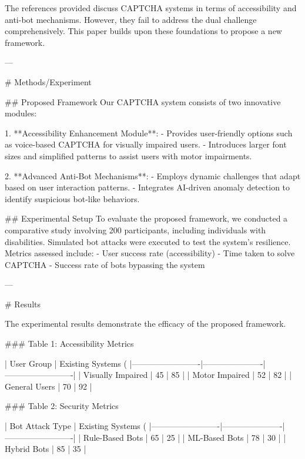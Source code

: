 The references provided discuss CAPTCHA systems in terms of accessibility and anti-bot mechanisms. However, they fail to address the dual challenge comprehensively. This paper builds upon these foundations to propose a new framework.

---

# Methods/Experiment  

## Proposed Framework  
Our CAPTCHA system consists of two innovative modules:  

1. **Accessibility Enhancement Module**:  
   - Provides user-friendly options such as voice-based CAPTCHA for visually impaired users.  
   - Introduces larger font sizes and simplified patterns to assist users with motor impairments.  

2. **Advanced Anti-Bot Mechanisms**:  
   - Employs dynamic challenges that adapt based on user interaction patterns.  
   - Integrates AI-driven anomaly detection to identify suspicious bot-like behaviors.  

## Experimental Setup  
To evaluate the proposed framework, we conducted a comparative study involving 200 participants, including individuals with disabilities. Simulated bot attacks were executed to test the system's resilience. Metrics assessed include:  
- User success rate (accessibility)  
- Time taken to solve CAPTCHA  
- Success rate of bots bypassing the system  

---

# Results  

The experimental results demonstrate the efficacy of the proposed framework.  

### Table 1: Accessibility Metrics  

| User Group              | Existing Systems (%
|-------------------------|----------------------|-------------------------|  
| Visually Impaired       | 45                  | 85                      |  
| Motor Impaired          | 52                  | 82                      |  
| General Users           | 70                  | 92                      |  

### Table 2: Security Metrics  

| Bot Attack Type         | Existing Systems (%
|-------------------------|----------------------|-------------------------|  
| Rule-Based Bots         | 65                  | 25                      |  
| ML-Based Bots           | 78                  | 30                      |  
| Hybrid Bots             | 85                  | 35                      |  


